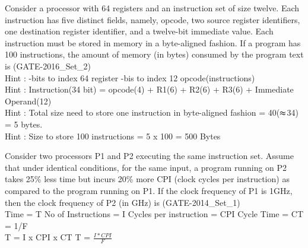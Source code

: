 \begin{questyle}
  \question  Consider a processor with 64 registers and an instruction set of size twelve. Each
             instruction has five distinct fields, namely, opcode, two source register identifiers,
             one destination register identifier, and a twelve-bit immediate value. Each instruction
             must be stored in memory in a byte-aligned fashion. If a program has 100 instructions,
             the amount of memory (in bytes) consumed by the program text is \fillin[500] (GATE-2016\_Set\_2)
             \\ Hint : -bits to index 64 register -bis to index 12 opcode(instructions)
             \\ Hint : \quad Instruction(34 bit) = opcode(4) + R1(6) + R2(6) + R3(6) + Immediate Operand(12)
             \\ Hint : \quad Total size need to store one instruction in byte-aligned fashion = 40(\(\thickapprox\)34) = 5 bytes.
             \\ Hint : \quad Size to store 100 instructions = 5 x 100 = 500 Bytes
\end{questyle}


\begin{questyle}
  \question  Consider two processors P1 and P2 executing the same instruction set. Assume that under
             identical conditions, for the same input, a program running on P2 takes 25\% less time but
             incurs 20\% more CPI (clock cycles per instruction) as compared to the program
             running on P1. If the clock frequency of P1 is 1GHz, then the clock frequency of
             P2 (in GHz) is \fillin[1.6]  (GATE-2014\_Set\_1)
             \\ Time = T \quad No of Instructions = I \quad Cycles per instruction = CPI \quad Cycle Time = CT = 1/F
             \\ T = I x CPI x CT  \qquad  T = { \Large \( \frac{I * CPI}{F}  \) }
\end{questyle}


